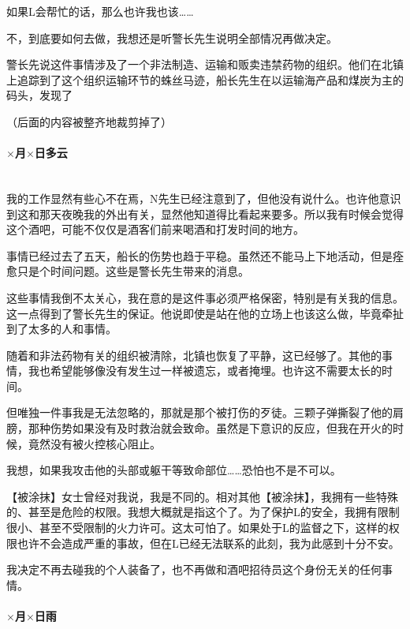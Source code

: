 如果L会帮忙的话，那么也许我也该……

不，到底要如何去做，我想还是听警长先生说明全部情况再做决定。

警长先说这件事情涉及了一个非法制造、运输和贩卖违禁药物的组织。他们在北镇上追踪到了这个组织运输环节的蛛丝马迹，船长先生在以运输海产品和煤炭为主的码头，发现了

（后面的内容被整齐地裁剪掉了）



\par

\paragraph*{$\times$月$\times$日\quad 多云}\mbox{}\\

我的工作显然有些心不在焉，N先生已经注意到了，但他没有说什么。也许他意识到这和那天夜晚我的外出有关，显然他知道得比看起来要多。所以我有时候会觉得这个酒吧，可能不仅仅是酒客们前来喝酒和打发时间的地方。

事情已经过去了五天，船长的伤势也趋于平稳。虽然还不能马上下地活动，但是痊愈只是个时间问题。这些是警长先生带来的消息。

这些事情我倒不太关心，我在意的是这件事必须严格保密，特别是有关我的信息。这一点得到了警长先生的保证。他说即使是站在他的立场上也该这么做，毕竟牵扯到了太多的人和事情。

随着和非法药物有关的组织被清除，北镇也恢复了平静，这已经够了。其他的事情，我也希望能够像没有发生过一样被遗忘，或者掩埋。也许这不需要太长的时间。

但唯独一件事我是无法忽略的，那就是那个被打伤的歹徒。三颗子弹撕裂了他的肩膀，那种伤势如果没有及时救治就会致命。虽然是下意识的反应，但我在开火的时候，竟然没有被火控核心阻止。

我想，如果我攻击他的头部或躯干等致命部位……恐怕也不是不可以。

【被涂抹】女士曾经对我说，我是不同的。相对其他【被涂抹】，我拥有一些特殊的、甚至是危险的权限。我想大概就是指这个了。为了保护L的安全，我拥有限制很小、甚至不受限制的火力许可。这太可怕了。如果处于L的监督之下，这样的权限也许不会造成严重的事故，但在L已经无法联系的此刻，我为此感到十分不安。

我决定不再去碰我的个人装备了，也不再做和酒吧招待员这个身份无关的任何事情。

\par

\paragraph*{$\times$月$\times$日\quad 雨}\mbox{}\\

